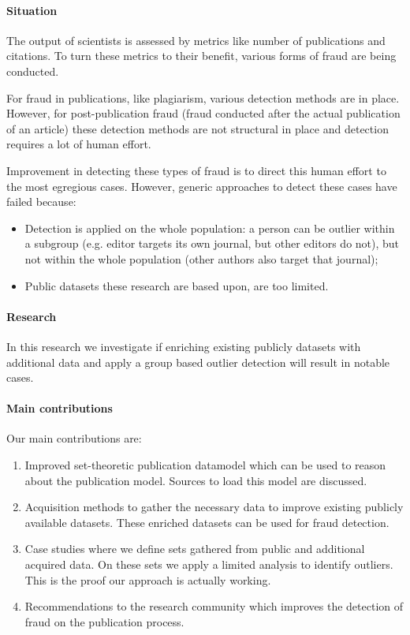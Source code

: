 \documentclass{ou-report}
\begin{document}
\paragraph{Situation}
The output of scientists is assessed by metrics like number of publications 
and citations. To turn these metrics to their benefit, various forms of fraud
are being conducted.

For fraud in publications, like plagiarism, various detection methods are in place. 
However, for post-publication fraud (fraud conducted after the actual publication of an 
article) these detection 
methods are not structural in place and detection requires a lot of human effort.

Improvement in detecting these types of fraud is to direct this human effort to the most
egregious cases. However, generic approaches to detect these cases 
have failed because:
\begin{itemize}
    \item Detection is applied on the whole population: a person can be outlier
        within a subgroup (e.g. editor targets its own journal, but other editors do not), 
        but not within the whole population (other authors also target that journal);
    \item Public datasets these research are based upon, are too limited.
\end{itemize}

\paragraph{Research}
In this research we investigate if enriching existing publicly datasets with 
additional data and apply a group based outlier detection will result in 
notable cases.

\paragraph{Main contributions}
Our main contributions are:
\begin{enumerate}
    \item Improved set-theoretic publication datamodel which can be used to 
        reason about the publication model. Sources to load this model are 
        discussed.
    \item Acquisition methods to gather the necessary data to improve existing 
        publicly available datasets. These enriched datasets can be used for
        fraud detection.
    \item Case studies where we define sets gathered from public and additional
        acquired data. On these sets we apply a limited analysis to identify 
        outliers. This is the proof our approach is actually working.
    \item Recommendations to the research community which improves the detection of 
        fraud on the publication process. 
\end{enumerate}
\end{document}
